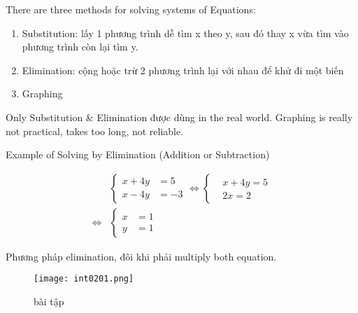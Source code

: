 There are three methods for solving systems of Equations:

\begin{enumerate}
  \item Substitution: lấy 1 phương trình dễ tìm x theo y, sau đó thay x vừa tìm vào phương trình còn lại tìm y.
  \item Elimination: cộng hoặc trừ 2 phương trình lại với nhau để khử đi một biến
  \item Graphing
\end{enumerate}

Only Substitution \& Elimination được dùng in the real world. Graphing is really not practical, takes too long, not reliable.


Example of Solving by Elimination (Addition or Subtraction)

\[
  \begin{aligned}
    &\left\{\begin{aligned} 
      x + 4y &= 5 \\ 
      x - 4y &= -3
    \end{aligned}\right. \iff 
    \left\{\begin{aligned}
      &x +4y = 5\\ 
      &2x = 2
    \end{aligned}\right.
    \\
    \iff &\left\{\begin{aligned} 
      x &= 1 \\ 
      y &= 1
    \end{aligned}\right.
  \end{aligned}
\]

\newpage

Phương pháp elimination, đôi khi phải multiply both equation.

\begin{figure}[htb!]
  \centering
  \texttt{[image: int0201.png]}
  \caption{bài tập}
\end{figure}

